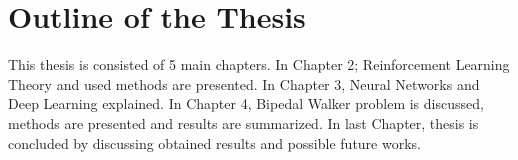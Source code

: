 \section{Outline of the Thesis}
\label{sec:outline}
This thesis is consisted of 5 main chapters. In Chapter 2; Reinforcement Learning Theory and used methods are presented. In Chapter 3, Neural Networks and Deep Learning explained. In Chapter 4, Bipedal Walker problem is discussed, methods are presented and results are summarized. In last Chapter, thesis is concluded by discussing obtained results and possible future works.